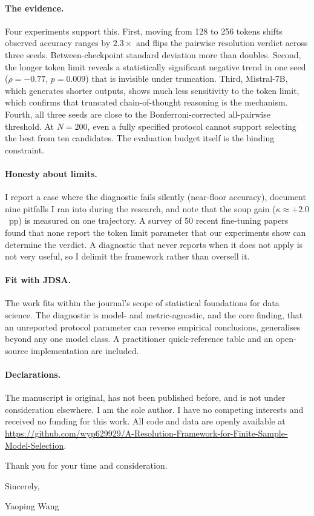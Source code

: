 \documentclass[12pt]{article}
\begin{document}
\paragraph{The evidence.}
Four experiments support this. First, moving from 128 to 256 tokens shifts observed accuracy ranges by $2.3\times$ and flips the pairwise resolution verdict across three seeds. Between-checkpoint standard deviation more than doubles. Second, the longer token limit reveals a statistically significant negative trend in one seed ($\rho=-0.77$, $p=0.009$) that is invisible under truncation. Third, Mistral-7B, which generates shorter outputs, shows much less sensitivity to the token limit, which confirms that truncated chain-of-thought reasoning is the mechanism. Fourth, all three seeds are close to the Bonferroni-corrected all-pairwise threshold. At $N=200$, even a fully specified protocol cannot support selecting the best from ten candidates. The evaluation budget itself is the binding constraint.

\paragraph{Honesty about limits.}
I report a case where the diagnostic fails silently (near-floor accuracy), document nine pitfalls I ran into during the research, and note that the soup gain ($\kappa \approx +2.0$~pp) is measured on one trajectory. A survey of 50 recent fine-tuning papers found that none report the token limit parameter that our experiments show can determine the verdict. A diagnostic that never reports when it does not apply is not very useful, so I delimit the framework rather than oversell it.

\paragraph{Fit with JDSA.}
The work fits within the journal's scope of statistical foundations for data science. The diagnostic is model- and metric-agnostic, and the core finding, that an unreported protocol parameter can reverse empirical conclusions, generalises beyond any one model class. A practitioner quick-reference table and an open-source implementation are included.

\paragraph{Declarations.}
The manuscript is original, has not been published before, and is not under consideration elsewhere. I am the sole author. I have no competing interests and received no funding for this work. All code and data are openly available at \url{https://github.com/wyp629929/A-Resolution-Framework-for-Finite-Sample-Model-Selection}.

\vspace{2em}

Thank you for your time and consideration.

\vspace{1em}

Sincerely,

\vspace{2em}

Yaoping Wang
\end{document}
